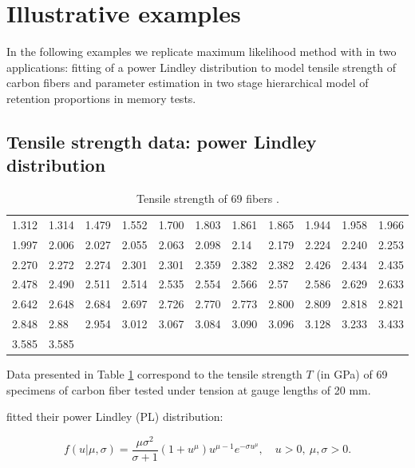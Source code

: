\documentclass[nojss]{jss}
\begin{document}
\section{Illustrative examples} \label{sec:illustrations}

In the following examples we replicate maximum likelihood method with  in two applications: fitting of a power Lindley distribution to model tensile strength of carbon fibers and parameter estimation in two stage hierarchical model of retention proportions in memory tests.

\subsection{Tensile strength data: power Lindley distribution}

\begin{table}[H]
\centering
\begin{tabular}{lllllllllll}
      &       &       &       &       &       &       &       &       &       &       \\ \hline
1.312 & 1.314 & 1.479 & 1.552 & 1.700 & 1.803 & 1.861 & 1.865 & 1.944 & 1.958 & 1.966 \\
1.997 & 2.006 & 2.027 & 2.055 & 2.063 & 2.098 & 2.14  & 2.179 & 2.224 & 2.240 & 2.253 \\
2.270 & 2.272 & 2.274 & 2.301 & 2.301 & 2.359 & 2.382 & 2.382 & 2.426 & 2.434 & 2.435 \\
2.478 & 2.490 & 2.511 & 2.514 & 2.535 & 2.554 & 2.566 & 2.57  & 2.586 & 2.629 & 2.633 \\
2.642 & 2.648 & 2.684 & 2.697 & 2.726 & 2.770 & 2.773 & 2.800 & 2.809 & 2.818 & 2.821 \\
2.848 & 2.88  & 2.954 & 3.012 & 3.067 & 3.084 & 3.090 & 3.096 & 3.128 & 3.233 & 3.433 \\
3.585 & 3.585 &       &       &       &       &       &       &       &       &       \\ \hline
\end{tabular}
\caption{\label{tab:PLdata}Tensile strength of 69 fibers \citep{Devendra2013}.}
\end{table}

Data presented in Table \ref{tab:PLdata} correspond to the tensile strength $T$ (in GPa) of 69 specimens of carbon fiber tested under tension at gauge lengths of 20 mm.

\cite{Ghitany2013} fitted their power Lindley (PL) distribution:

\begin{equation}
f(u|\mu,\sigma) = \frac{\mu \sigma^2}{\sigma + 1} (1 + u^\mu) u ^ {\mu - 1} e^{-\sigma u ^\mu}, \quad u>0, \: \mu, \sigma>0.
\end{equation}
\end{document}
